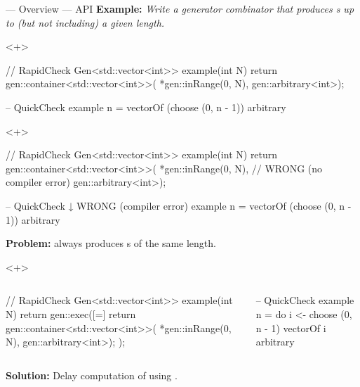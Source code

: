 \begin{frame}[fragile,t]{\halcheck{} --- Overview --- API}
  \textbf{Example:} \emph{Write a generator combinator that produces s up to (but not including) a given length.}

  \begin{onlyenv}<+>
    \begin{cppcode}
      // RapidCheck
      Gen<std::vector<int>> example(int N) {
        return gen::container<std::vector<int>>(
          *gen::inRange(0, N),
          gen::arbitrary<int>);
      }
    \end{cppcode}

    \begin{haskellcode}
      -- QuickCheck
      example n = vectorOf (choose (0, n - 1)) arbitrary
    \end{haskellcode}
  \end{onlyenv}

  \begin{onlyenv}<+>
    \begin{cppcode}
      // RapidCheck
      Gen<std::vector<int>> example(int N) {
        return gen::container<std::vector<int>>(
          *gen::inRange(0, N), // WRONG (no compiler error)
          gen::arbitrary<int>);
      }
    \end{cppcode}

    \begin{haskellcode}
      -- QuickCheck         ↓ WRONG (compiler error)
      example n = vectorOf (choose (0, n - 1)) arbitrary
    \end{haskellcode}

    \textbf{Problem:}  always produces s of the same length.
  \end{onlyenv}

  \begin{onlyenv}<+>
    \begin{columns}[T,onlytextwidth]
      \begin{cppcode}
        // RapidCheck
        Gen<std::vector<int>> example(int N) {
          return gen::exec([=] {
            return gen::container<std::vector<int>>(
              *gen::inRange(0, N),
              gen::arbitrary<int>);
          });
        }
      \end{cppcode}

      \begin{haskellcode}
        -- QuickCheck
        example n = do
          i <- choose (0, n - 1)
          vectorOf i arbitrary
      \end{haskellcode}
    \end{columns}

    \textbf{Solution:} Delay computation of  using .
  \end{onlyenv}
\end{frame}


